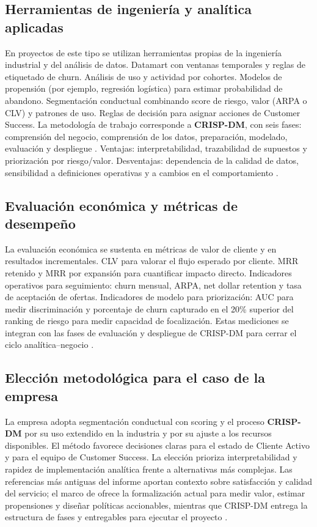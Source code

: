 \subsection{Herramientas de ingeniería y analítica aplicadas}
En proyectos de este tipo se utilizan herramientas propias de la ingeniería industrial y del análisis de datos. Datamart con ventanas temporales y reglas de etiquetado de churn. Análisis de uso y actividad por cohortes. Modelos de propensión (por ejemplo, regresión logística) para estimar probabilidad de abandono. Segmentación conductual combinando score de riesgo, valor (ARPA o CLV) y patrones de uso. Reglas de decisión para asignar acciones de Customer Success. La metodología de trabajo corresponde a \textbf{CRISP-DM}, con seis fases: comprensión del negocio, comprensión de los datos, preparación, modelado, evaluación y despliegue \citep{Chapman2000}. Ventajas: interpretabilidad, trazabilidad de supuestos y priorización por riesgo/valor. Desventajas: dependencia de la calidad de datos, sensibilidad a definiciones operativas y a cambios en el comportamiento \citep{Kumar2010}.

\subsection{Evaluación económica y métricas de desempeño}
La evaluación económica se sustenta en métricas de valor de cliente y en resultados incrementales. CLV para valorar el flujo esperado por cliente. MRR retenido y MRR por expansión para cuantificar impacto directo. Indicadores operativos para seguimiento: churn mensual, ARPA, net dollar retention y tasa de aceptación de ofertas. Indicadores de modelo para priorización: AUC para medir discriminación y porcentaje de churn capturado en el 20\% superior del ranking de riesgo para medir capacidad de focalización. Estas mediciones se integran con las fases de evaluación y despliegue de CRISP-DM para cerrar el ciclo analítica–negocio \citep{Kumar2010,Chapman2000}.

\subsection{Elección metodológica para el caso de la empresa}
La empresa adopta segmentación conductual con scoring y el proceso \textbf{CRISP-DM} por su uso extendido en la industria y por su ajuste a los recursos disponibles. El método favorece decisiones claras para el estado de Cliente Activo y para el equipo de Customer Success. La elección prioriza interpretabilidad y rapidez de implementación analítica frente a alternativas más complejas. Las referencias más antiguas del informe aportan contexto sobre satisfacción y calidad del servicio; el marco de \citep{Kumar2010} ofrece la formalización actual para medir valor, estimar propensiones y diseñar políticas accionables, mientras que CRISP-DM entrega la estructura de fases y entregables para ejecutar el proyecto \citep{Chapman2000}.


